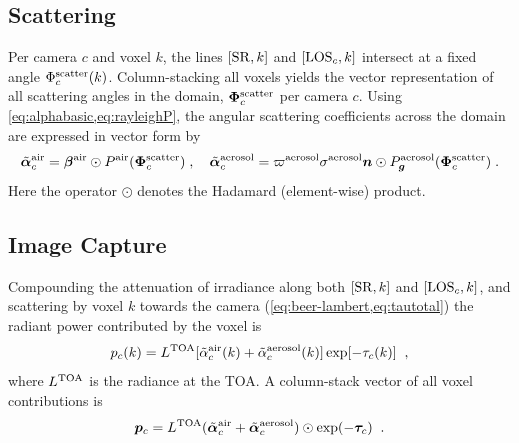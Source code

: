 \documentclass[10pt,letterpaper]{article}
\newcommand{\vect}[1]{\bm{#1}}
\begin{document}

\subsection{Scattering}
\label{sec:scattering}

Per camera $c$ and voxel $k$, the lines $[{\rm SR},k]$ and $[{\rm
  LOS}_c,k]$ intersect at a fixed angle $\Phi^{\rm scatter}_c(k)$.
Column-stacking all voxels yields the vector representation of all
scattering angles in the domain, $\vect{\Phi}^{\rm scatter}_c$ per
camera $c$.
Using \cref{eq:alphabasic,eq:rayleighP}, the angular scattering
coefficients across the domain are expressed in vector form by
\begin{equation}
  \tilde{\vect{\alpha}}^{\rm air}_c =
  \vect{\beta}^{\rm air} \odot P^{\rm air}(\vect{\Phi}^{\rm scatter}_c)\;,
  \quad
  \tilde{\vect{\alpha}}^{\rm aerosol}_c =
  \varpi^{\rm aerosol} \sigma^{\rm aerosol}
  {\bm n} \odot P^{\rm aerosol}_{\bm g}(\vect{\Phi}^{\rm scatter}_c) \;.
  \label{eq:alpha_matrix}
\end{equation}
Here the operator $\odot$ denotes the Hadamard (element-wise) product.


\subsection{Image Capture}
\label{sec:captured-image}

Compounding the attenuation of irradiance along both $[{\rm SR},k]$
and $[{\rm LOS}_c,k]$, and scattering by voxel $k$ towards the camera
(\cref{eq:beer-lambert,eq:tautotal}) the radiant power contributed by
the voxel is
\begin{equation}
  p_c(k)= L^{\rm TOA}
  [\tilde{\alpha}^{\rm air}_c(k) + \tilde{\alpha}^{\rm aerosol}_c(k)]
  \exp[-\tau_c(k)]
  \;\;,
  \label{eq:ick}
\end{equation}
where $L^{\rm TOA}$ is the radiance at the TOA. A column-stack vector
of all voxel contributions is
\begin{equation}
  {\bm p}_c= L^{\rm TOA}
  (\tilde{\vect{\alpha}}^{\rm air}_c + \tilde{\vect{\alpha}}^{\rm aerosol}_c)
  \odot \exp(-\vect{\tau}_c)
  \;\;.
  \label{eq:pc}
\end{equation}
\end{document}
